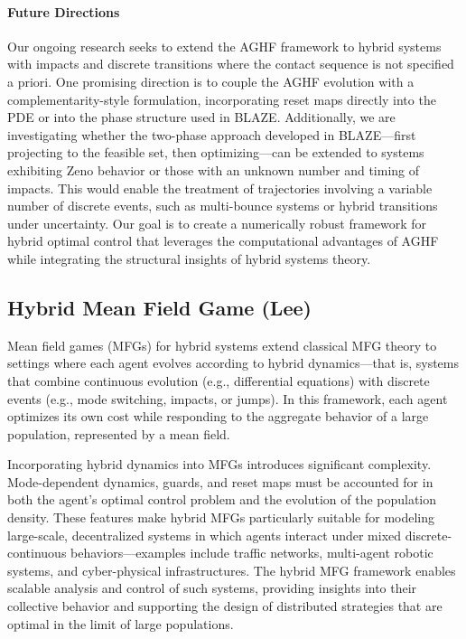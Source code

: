 \documentclass[letterpaper,11pt]{article}
\begin{document}
\paragraph{Future Directions}

Our ongoing research seeks to extend the AGHF framework to hybrid systems with impacts and discrete transitions where the contact sequence is not specified a priori.
One promising direction is to couple the AGHF evolution with a complementarity-style formulation, incorporating reset maps directly into the PDE or into the phase structure used in BLAZE.
Additionally, we are investigating whether the two-phase approach developed in BLAZE—first projecting to the feasible set, then optimizing—can be extended to systems exhibiting Zeno behavior or those with an unknown number and timing of impacts.
This would enable the treatment of trajectories involving a variable number of discrete events, such as multi-bounce systems or hybrid transitions under uncertainty.
Our goal is to create a numerically robust framework for hybrid optimal control that leverages the computational advantages of AGHF while integrating the structural insights of hybrid systems theory.

\subsection{Hybrid Mean Field Game (Lee)}\label{sec:hybrid_MFG}

Mean field games (MFGs) for hybrid systems extend classical MFG theory to settings where each agent evolves according to hybrid dynamics—that is, systems that combine continuous evolution (e.g., differential equations) with discrete events (e.g., mode switching, impacts, or jumps).
In this framework, each agent optimizes its own cost while responding to the aggregate behavior of a large population, represented by a mean field.

Incorporating hybrid dynamics into MFGs introduces significant complexity.
Mode-dependent dynamics, guards, and reset maps must be accounted for in both the agent’s optimal control problem and the evolution of the population density.
These features make hybrid MFGs particularly suitable for modeling large-scale, decentralized systems in which agents interact under mixed discrete-continuous behaviors—examples include traffic networks, multi-agent robotic systems, and cyber-physical infrastructures.
The hybrid MFG framework enables scalable analysis and control of such systems, providing insights into their collective behavior and supporting the design of distributed strategies that are optimal in the limit of large populations.
\end{document}
